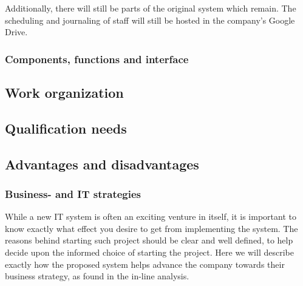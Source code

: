 Additionally, there will still be parts of the original system which remain. 
The scheduling and journaling of staff will still be hosted in the company's 
Google Drive. 

\subsubsection{Components, functions and interface}

\subsection{Work organization}

\subsection{Qualification needs}
	
\subsection{Advantages and disadvantages}
\subsubsection{Business- and IT strategies}
While a new IT system is often an exciting venture in itself, it is important to
know exactly what effect you desire to get from implementing the system. The 
reasons behind starting such project should be clear and well defined, to help
decide upon the informed choice of starting the project. Here we will describe 
exactly how the proposed system helps advance the company towards their 
business strategy, as found in the in-line analysis. 

